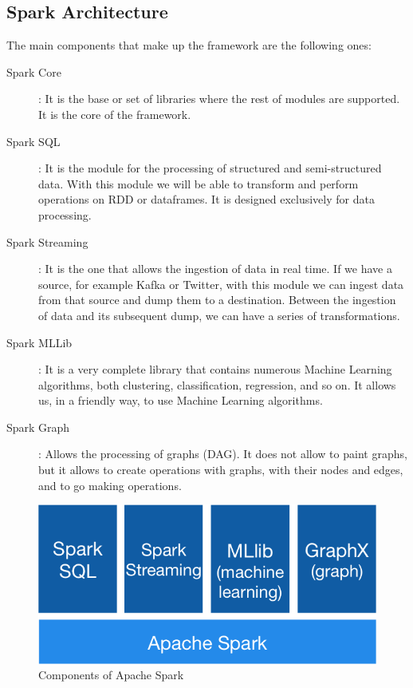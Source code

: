\subsection{Spark Architecture}

The main components that make up the framework are the following ones:

\begin{description}

	\item[Spark Core]: It is the base or set of libraries where the rest of modules are supported. It is the core of the framework.
	
	
	\item[Spark SQL]: It is the module for the processing of structured and semi-structured data. With this module we will be able to transform and perform operations on RDD or dataframes. It is designed exclusively for data processing.
	
	
	\item[Spark Streaming]: It is the one that allows the ingestion of data in real time. If we have a source, for example Kafka or Twitter, with this module we can ingest data from that source and dump them to a destination. Between the ingestion of data and its subsequent dump, we can have a series of transformations.
	
	
	\item[Spark MLLib]: It is a very complete library that contains numerous Machine Learning algorithms, both clustering, classification, regression, and so on. It allows us, in a friendly way, to use Machine Learning algorithms.
	
	
	\item[Spark Graph]: Allows the processing of graphs (DAG). It does not allow to paint graphs, but it allows to create operations with graphs, with their nodes and edges, and to go making operations.
\end{description}


\begin{figure}[h]
	\centering
	\includegraphics[scale=0.65]{figs/spark-components.png}
	\caption{Components of Apache Spark}
	\label{fig:components-spark}
\end{figure}

